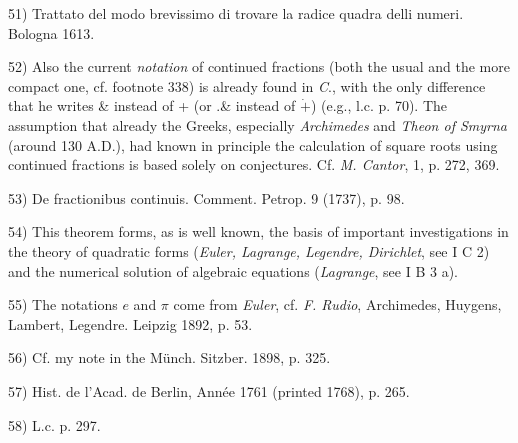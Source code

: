 \vfill
\leftline{\rule{2in}{0.4pt}}
\vspace{0.2cm}
{
\footnotesize
51) Trattato del modo brevissimo di trovare la radice quadra delli numeri. Bologna 1613.

52) Also the current \textit{notation} of continued fractions (both the usual and the more compact one, cf. footnote 338) is already found in \textit{C}., with the only difference that he writes \& instead of + (or .\& instead of $\dot{+}$) (e.g., l.c. p. 70). The assumption that already the Greeks, especially \textit{Archimedes} and \textit{Theon of Smyrna} (around 130 A.D.), had known in principle the calculation of square roots using continued fractions is based solely on conjectures. Cf. \textit{M. Cantor}, 1, p. 272, 369.

53) De fractionibus continuis. Comment. Petrop. 9 (1737), p. 98.

54) This theorem forms, as is well known, the basis of important investigations in the theory of quadratic forms (\textit{Euler, Lagrange, Legendre, Dirichlet}, see I C 2) and the numerical solution of algebraic equations (\textit{Lagrange}, see I B 3 a).

55) The notations $e$ and $\pi$ come from \textit{Euler}, cf. \textit{F. Rudio}, Archimedes, Huygens, Lambert, Legendre. Leipzig 1892, p. 53.

56) Cf. my note in the Münch. Sitzber. 1898, p. 325.

57) Hist. de l'Acad. de Berlin, Année 1761 (printed 1768), p. 265.

58) L.c. p. 297.

}